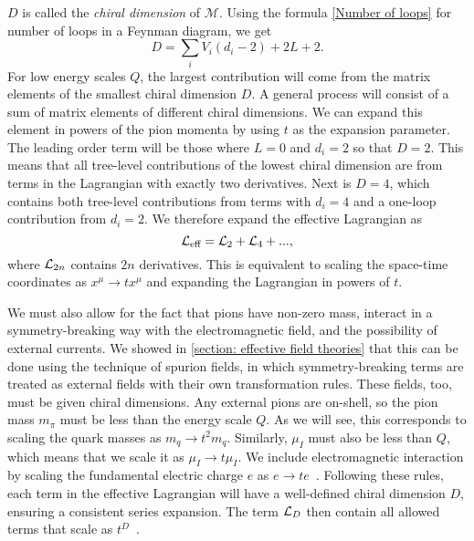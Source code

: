 $D$ is called the \emph{chiral dimension} of $\mathcal M$.
Using the formula \autoref{Number of loops} for number of loops in a Feynman diagram, we get
\begin{equation}
    D = \sum_i V_i(d_i - 2) + 2 L + 2.
\end{equation}
%
For low energy scales $Q$, the largest contribution will come from the matrix elements of the smallest chiral dimension $D$.
A general process will consist of a sum of matrix elements of different chiral dimensions.
We can expand this element in powers of the pion momenta by using $t$ as the expansion parameter.
The leading order term will be those where $L = 0$ and $d_i = 2$ so that $D = 2$.
This means that all tree-level contributions of the lowest chiral dimension are from terms in the Lagrangian with exactly two derivatives.
Next is $D = 4$, which contains both tree-level contributions from terms with $d_i = 4$ and a one-loop contribution from $d_i = 2$.
We therefore expand the effective Lagrangian as
\begin{equation}
    \mathcal{L}_\text{eff} = \mathcal{L}_2 + \mathcal{L}_4 + ...,
\end{equation}
%
where $\mathcal{L}_{2n}$ contains $2n$ derivatives.
This is equivalent to scaling the space-time coordinates as $x^\mu \rightarrow tx^\mu$ and expanding the Lagrangian in powers of $t$.

We must also allow for the fact that pions have non-zero mass, interact in a symmetry-breaking way with the electromagnetic field, and the possibility of external currents.
We showed in \autoref{section: effective field theories} that this can be done using the technique of spurion fields, in which symmetry-breaking terms are treated as external fields with their own transformation rules.
These fields, too, must be given chiral dimensions.
Any external pions are on-shell, so the pion mass $m_\pi$ must be less than the energy scale $Q$.
As we will see, this corresponds to scaling the quark masses as $m_q \rightarrow t^2 m_q$.
Similarly, $\mu_I$ must also be less than $Q$, which means that we scale it as $\mu_I\rightarrow t \mu_I$.
We include electromagnetic interaction by scaling the fundamental electric charge $e$ as $e\rightarrow te$~\autocite{urechVirtualPhotonsChiral1995}.
Following these rules, each term in the effective Lagrangian will have a well-defined chiral dimension $D$, ensuring a consistent series expansion.
The term $\mathcal{L}_{D}$ then contain all allowed terms that scale as $t^D$~\autocite{schererIntroductionChiralPerturbation2002,weinbergPhenomenologicalLagrangians1979a,weinbergQuantumTheoryFields1996}.

